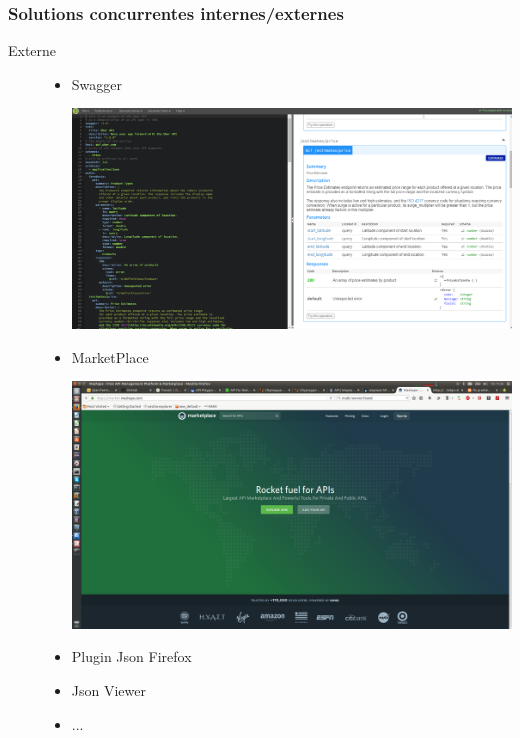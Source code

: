 \documentclass[table]{beamer}
\begin{document}
\begin{frame}
\begin{description}
\begin{itemize}
\begin{center}
          \end{center}
      \end{itemize}
  \end{description}
\end{frame}

\begin{frame}
  \frametitle{Solutions concurrentes internes/externes}
  \begin{description}
    \item[Externe] 
    \begin{itemize} 
      \item Swagger 
      \begin{center}
        \includegraphics[height=0.3\textheight]{images/swagger}
      \end{center}
      \item MarketPlace 
      \begin{center}
        \includegraphics[height=0.3\textheight]{images/marketplace}
      \end{center}
      \item Plugin Json Firefox
      \item Json Viewer
      \item ...
    \end{itemize}
  \end{description}
\end{frame}
\end{document}

